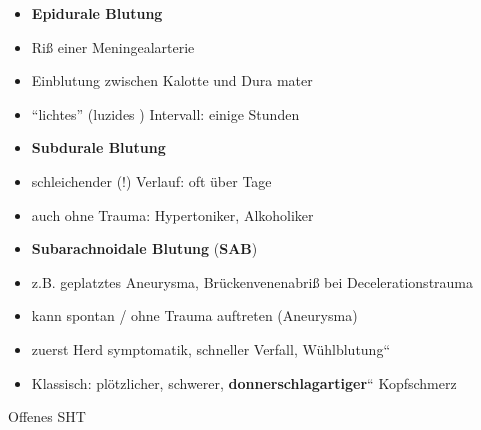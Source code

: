 \documentclass{article}
\newcommand\gEs[1]{\textbf{\textcolor[rgb]{0.0,0.0,0.5019608}{#1}}}
\newcommand\gEs[1]{\textbf{\textcolor[rgb]{0.0,0.0,0.5019608}{#1}}}
\newcommand\gT[1]{\textbf{\textup{\textcolor[rgb]{0.0,0.5019608,0.0}{#1}}}}
\begin{document}
\begin{itemize}
\item {\mdseries
{}\gT{Epidurale Blutung} }

\end{itemize}
\begin{itemize}
\item {\mdseries
Ri{\ss} einer Meningealarterie}

\item {\mdseries
Einblutung zwischen Kalotte und Dura mater}

\item {\mdseries
{\textquotedblleft}lichtes{\textquotedblright} (luzides ) Intervall:
einige Stunden}

\end{itemize}
\begin{itemize}
\item {\mdseries
{}\gT{Subdurale  Blutung} }

\end{itemize}
\begin{itemize}
\item {\mdseries
schleichender  (!) Verlauf: oft \"uber Tage}

\item {\mdseries
auch ohne  Trauma: Hypertoniker, Alkoholiker}

\end{itemize}
\begin{itemize}
\item {\mdseries
{}\gT{Subarachnoidale 
Blutung} (\gT{SAB})}

\end{itemize}
\begin{itemize}
\item {\mdseries
z.B. geplatztes Aneurysma, Br\"uckenvenenabri{\ss} bei
Decelerationstrauma}

\end{itemize}
\begin{itemize}
\item {\mdseries
kann spontan / ohne Trauma auftreten (Aneurysma)}

\end{itemize}
\begin{itemize}
\item {\mdseries
zuerst Herd symptomatik, schneller  Verfall, 
{\quotedblbase}W\"uhlblutung{\textquotedblleft}}

\item {\mdseries
Klassisch: pl\"otzlicher, schwerer,
{\quotedblbase}\gEs{donnerschlagartiger}{\textquotedblleft}
Kopfschmerz}

\end{itemize}
{\mdseries\color[rgb]{0.0,0.0,0.5019608}
Offenes SHT}
\end{document}
